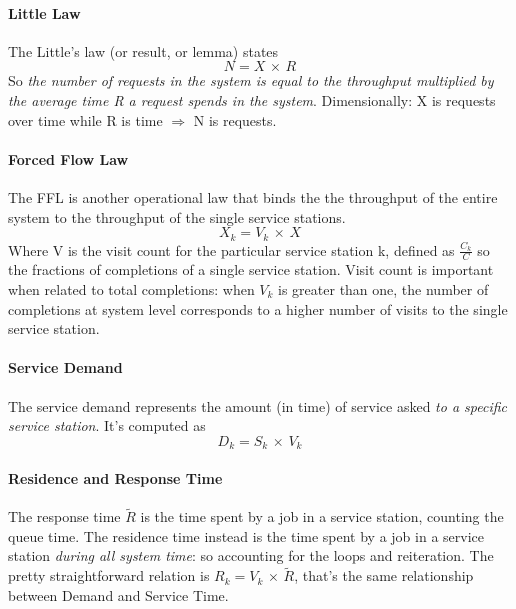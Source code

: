 \documentclass[10pt,a4paper]{article}
\begin{document}
				\paragraph{Little Law}
					The Little's law (or result, or lemma) states
					\begin{equation}
						N = X \,\times\,R
					\end{equation}
					So \emph{the number of requests in the system is equal to the throughput multiplied by the average time R a request spends in the system}. Dimensionally: X is requests over time while R is time $\Rightarrow$ N is requests.
					
				\paragraph{Forced Flow Law}
					The FFL is another operational law that binds the the throughput of the entire system to the throughput of the single service stations.
					\begin{equation}
						X_k = V_k \,\times\, X
					\end{equation}
					Where V is the visit count for the particular service station k, defined as $\frac{C_k}{C}$ so the fractions of completions of a single service station. Visit count is important when related to total completions: when $V_k$ is greater than one, the number of completions at system level corresponds to a higher number of visits to the single service station.  
					
				\paragraph{Service Demand}
					The service demand represents the amount (in time) of service asked \emph{to a specific service station}. It's computed as
					\begin{equation}
						D_k = S_k \,\times\, V_k
					\end{equation}
					
				\paragraph{Residence and Response Time}
					The response time $\tilde{R}$ is the time spent by a job in a service station, counting the queue time. The residence time instead is the time spent by a job in a service station \emph{during all system time}: so accounting for the loops and reiteration. The pretty straightforward relation is $R_k = V_k \,\times\, \tilde{R}$, that's the same relationship between Demand and Service Time. 
					
\end{document}
